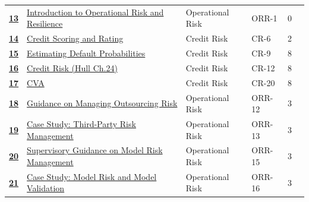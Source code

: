 \begin{longtable}{@{}r@{\hskip 7pt}L{6.35cm}@{\hskip 5pt}l@{\hskip 10pt}l@{\hskip 3pt}r@{\hskip 7pt}r@{}}
\hyperref[roi:13]{{\sffamily\bfseries\color{FRMGold}13}} & \hyperref[roi:13]{{\color{black}Introduction to Operational Risk and Resilience}} & {\color{FRMGrey}Operational Risk} & {\color{FRMGrey}ORR-1} & {\color{FRMGrey}0} & \hyperref[roi:13]{{\sffamily\bfseries\color{FRMNavy}\pageref{roi:13}}} \\
\hyperref[roi:14]{{\sffamily\bfseries\color{FRMGold}14}} & \hyperref[roi:14]{{\color{black}Credit Scoring and Rating}} & {\color{FRMGrey}Credit Risk} & {\color{FRMGrey}CR-6} & {\color{FRMGrey}2} & \hyperref[roi:14]{{\sffamily\bfseries\color{FRMNavy}\pageref{roi:14}}} \\
\hyperref[roi:15]{{\sffamily\bfseries\color{FRMGold}15}} & \hyperref[roi:15]{{\color{black}Estimating Default Probabilities}} & {\color{FRMGrey}Credit Risk} & {\color{FRMGrey}CR-9} & {\color{FRMGrey}8} & \hyperref[roi:15]{{\sffamily\bfseries\color{FRMNavy}\pageref{roi:15}}} \\
\hyperref[roi:16]{{\sffamily\bfseries\color{FRMGold}16}} & \hyperref[roi:16]{{\color{black}Credit Risk (Hull Ch.24)}} & {\color{FRMGrey}Credit Risk} & {\color{FRMGrey}CR-12} & {\color{FRMGrey}8} & \hyperref[roi:16]{{\sffamily\bfseries\color{FRMNavy}\pageref{roi:16}}} \\
\hyperref[roi:17]{{\sffamily\bfseries\color{FRMGold}17}} & \hyperref[roi:17]{{\color{black}CVA}} & {\color{FRMGrey}Credit Risk} & {\color{FRMGrey}CR-20} & {\color{FRMGrey}8} & \hyperref[roi:17]{{\sffamily\bfseries\color{FRMNavy}\pageref{roi:17}}} \\
\hyperref[roi:18]{{\sffamily\bfseries\color{FRMGold}18}} & \hyperref[roi:18]{{\color{black}Guidance on Managing Outsourcing Risk}} & {\color{FRMGrey}Operational Risk} & {\color{FRMGrey}ORR-12} & {\color{FRMGrey}3} & \hyperref[roi:18]{{\sffamily\bfseries\color{FRMNavy}\pageref{roi:18}}} \\
\hyperref[roi:19]{{\sffamily\bfseries\color{FRMGold}19}} & \hyperref[roi:19]{{\color{black}Case Study: Third-Party Risk Management}} & {\color{FRMGrey}Operational Risk} & {\color{FRMGrey}ORR-13} & {\color{FRMGrey}3} & \hyperref[roi:19]{{\sffamily\bfseries\color{FRMNavy}\pageref{roi:19}}} \\
\hyperref[roi:20]{{\sffamily\bfseries\color{FRMGold}20}} & \hyperref[roi:20]{{\color{black}Supervisory Guidance on Model Risk Management}} & {\color{FRMGrey}Operational Risk} & {\color{FRMGrey}ORR-15} & {\color{FRMGrey}3} & \hyperref[roi:20]{{\sffamily\bfseries\color{FRMNavy}\pageref{roi:20}}} \\
\hyperref[roi:21]{{\sffamily\bfseries\color{FRMGold}21}} & \hyperref[roi:21]{{\color{black}Case Study: Model Risk and Model Validation}} & {\color{FRMGrey}Operational Risk} & {\color{FRMGrey}ORR-16} & {\color{FRMGrey}3} & \hyperref[roi:21]{{\sffamily\bfseries\color{FRMNavy}\pageref{roi:21}}} \\

\end{longtable}
